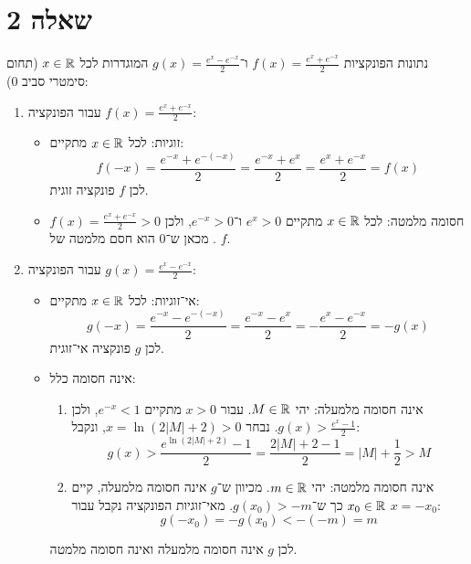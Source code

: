 \section{שאלה 2}
נתונות הפונקציות $f(x) = \frac{e^x + e^{-x}}{2}$ ו־$g(x) = \frac{e^x - e^{-x}}{2}$ המוגדרות לכל $x \in \mathbb{R}$ (תחום סימטרי סביב $0$):
\begin{enumerate}
	\item עבור הפונקציה $f(x) = \frac{e^x + e^{-x}}{2}$:
		\begin{itemize}
			\item זוגיות: לכל $x \in \mathbb{R}$ מתקיים:
				\[
					f(-x) = \frac{e^{-x} + e^{-(-x)}}{2} = \frac{e^{-x} + e^x}{2} = \frac{e^x + e^{-x}}{2} = f(x)
				\]
				לכן $f$ פונקציה זוגית.
			\item חסומה מלמטה: לכל $x \in \mathbb{R}$ מתקיים $e^x > 0$ ו־$e^{-x} > 0$, ולכן $f(x) = \frac{e^x + e^{-x}}{2} > 0$. מכאן ש־$0$ הוא חסם מלמטה של $f$.
		\end{itemize}

	\item עבור הפונקציה $g(x) = \frac{e^x - e^{-x}}{2}$:
		\begin{itemize}
			\item אי־זוגיות: לכל $x \in \mathbb{R}$ מתקיים:
				\[
					g(-x) = \frac{e^{-x} - e^{-(-x)}}{2} = \frac{e^{-x} - e^x}{2} = -\frac{e^x - e^{-x}}{2} = -g(x)
				\]
				לכן $g$ פונקציה אי־זוגית.
			\item אינה חסומה כלל:
				\begin{enumerate}
					\item אינה חסומה מלמעלה: יהי $M \in \mathbb{R}$. עבור $x > 0$ מתקיים $e^{-x} < 1$, ולכן $g(x) > \frac{e^x - 1}{2}$. נבחר $x = \ln(2|M| + 2) > 0$, ונקבל:
						\[
							g(x) > \frac{e^{\ln(2|M| + 2)} - 1}{2} = \frac{2|M| + 2 - 1}{2} = |M| + \frac{1}{2} > M
						\]
					\item אינה חסומה מלמטה: יהי $m \in \mathbb{R}$. מכיוון ש־$g$ אינה חסומה מלמעלה, קיים $x_0 \in \mathbb{R}$ כך ש־$g(x_0) > -m$. מאי־זוגיות הפונקציה נקבל עבור $x = -x_0$:
						\[
							g(-x_0) = -g(x_0) < -(-m) = m
						\]
				\end{enumerate}
				לכן $g$ אינה חסומה מלמעלה ואינה חסומה מלמטה.
		\end{itemize}
\end{enumerate}

